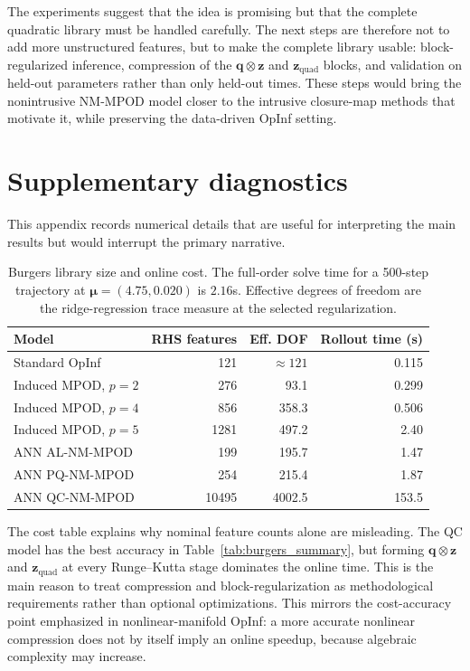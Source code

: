 \documentclass[11pt]{article}
\newcommand{\bq}{\boldsymbol q}
\newcommand{\bz}{\boldsymbol z}
\newcommand{\bmu}{\boldsymbol\mu}
\begin{document}
The experiments suggest that the idea is promising but that the complete
quadratic library must be handled carefully.  The next steps are therefore not
to add more unstructured features, but to make the complete library usable:
block-regularized inference, compression of the $\bq\otimes\bz$ and
$\bz_{\mathrm{quad}}$ blocks, and validation on held-out parameters rather than
only held-out times.  These steps would bring the nonintrusive NM-MPOD model
closer to the intrusive closure-map methods that motivate it, while preserving
the data-driven OpInf setting.

\appendix

\section{Supplementary diagnostics}
\label{app:audit}

This appendix records numerical details that are useful for interpreting the
main results but would interrupt the primary narrative.

\begin{table}[!htbp]
\centering
\caption{Burgers library size and online cost.  The full-order solve time for a
500-step trajectory at $\bmu=(4.75,0.020)$ is $2.16$s.  Effective degrees of
freedom are the ridge-regression trace measure at the selected regularization.}
\label{tab:cost_audit}
\begin{tabular}{lrrr}
\toprule
Model & RHS features & Eff. DOF & Rollout time (s)\\
\midrule
Standard OpInf & 121 & $\approx121$ & 0.115\\
Induced MPOD, $p=2$ & 276 & 93.1 & 0.299\\
Induced MPOD, $p=4$ & 856 & 358.3 & 0.506\\
Induced MPOD, $p=5$ & 1281 & 497.2 & 2.40\\
ANN AL-NM-MPOD & 199 & 195.7 & 1.47\\
ANN PQ-NM-MPOD & 254 & 215.4 & 1.87\\
ANN QC-NM-MPOD & 10495 & 4002.5 & 153.5\\
\bottomrule
\end{tabular}
\end{table}

The cost table explains why nominal feature counts alone are misleading.  The
QC model has the best accuracy in Table~\ref{tab:burgers_summary}, but forming
$\bq\otimes\bz$ and $\bz_{\mathrm{quad}}$ at every Runge--Kutta stage dominates
the online time.  This is the main reason to treat compression and
block-regularization as methodological requirements rather than optional
optimizations.  This mirrors the cost-accuracy point emphasized in
nonlinear-manifold OpInf: a more accurate nonlinear compression does not by
itself imply an online speedup, because algebraic complexity may increase.
\end{document}
